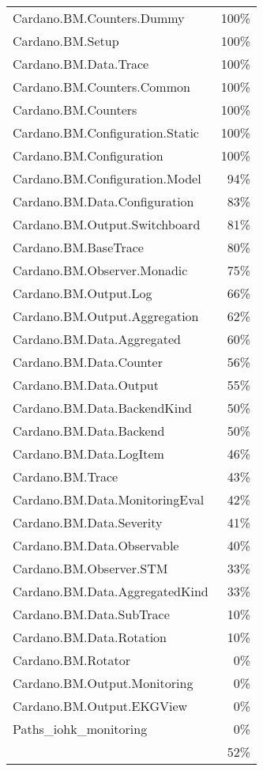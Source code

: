 \begin{tabular}{l r}
   Cardano.BM.Counters.Dummy & 100\% \\
   Cardano.BM.Setup & 100\% \\
   Cardano.BM.Data.Trace & 100\% \\
   Cardano.BM.Counters.Common & 100\% \\
   Cardano.BM.Counters & 100\% \\
   Cardano.BM.Configuration.Static & 100\% \\
   Cardano.BM.Configuration & 100\% \\
   Cardano.BM.Configuration.Model & 94\% \\
   Cardano.BM.Data.Configuration & 83\% \\
   Cardano.BM.Output.Switchboard & 81\% \\
   Cardano.BM.BaseTrace & 80\% \\
   Cardano.BM.Observer.Monadic & 75\% \\
   Cardano.BM.Output.Log & 66\% \\
   Cardano.BM.Output.Aggregation & 62\% \\
   Cardano.BM.Data.Aggregated & 60\% \\
   Cardano.BM.Data.Counter & 56\% \\
   Cardano.BM.Data.Output & 55\% \\
   Cardano.BM.Data.BackendKind & 50\% \\
   Cardano.BM.Data.Backend & 50\% \\
   Cardano.BM.Data.LogItem & 46\% \\
   Cardano.BM.Trace & 43\% \\
   Cardano.BM.Data.MonitoringEval & 42\% \\
   Cardano.BM.Data.Severity & 41\% \\
   Cardano.BM.Data.Observable & 40\% \\
   Cardano.BM.Observer.STM & 33\% \\
   Cardano.BM.Data.AggregatedKind & 33\% \\
   Cardano.BM.Data.SubTrace & 10\% \\
   Cardano.BM.Data.Rotation & 10\% \\
   Cardano.BM.Rotator & 0\% \\
   Cardano.BM.Output.Monitoring & 0\% \\
   Cardano.BM.Output.EKGView & 0\% \\
   Paths\_iohk\_monitoring & 0\% \\
    & 52\% \\
\end{tabular}
